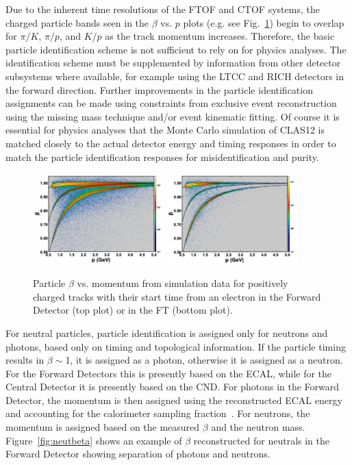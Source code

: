 Due to the inherent time resolutions of the FTOF and CTOF systems, the charged particle bands seen in the
$\beta$ vs. $p$ plots (e.g. see Fig.~\ref{fig:betavsp}) begin to overlap for $\pi/K$, $\pi/p$, and $K/p$ as
the track momentum increases. Therefore, the basic particle identification scheme is not sufficient to rely on
for physics analyses. The identification scheme must be supplemented by information from other detector
subsystems where available, for example using the LTCC and RICH detectors in the forward direction. Further
improvements in the particle identification assignments can be made using constraints from exclusive event
reconstruction using the missing mass technique and/or event kinematic fitting. Of course it is essential for
physics analyses that the Monte Carlo simulation of CLAS12 is matched closely to the actual detector energy and
timing responses in order to match the particle identification responses for misidentification and purity.

\begin{figure}[t]
\centering
\includegraphics[width=0.45\textwidth]{pics/ftof_betap.png}
\includegraphics[width=0.45\textwidth]{pics/ft_betap.png}
\caption{Particle $\beta$ vs. momentum from simulation data for positively charged tracks with their start time
  from an electron in the Forward Detector (top plot) or in the FT (bottom plot).}
\label{fig:betavsp}
\end{figure}

For neutral particles, particle identification is assigned only for neutrons and photons, based only on timing and
topological information. If the particle timing results in $\beta\sim$1, it is assigned as a photon, otherwise it
is assigned as a neutron. For the Forward Detectors this is presently based on the ECAL, while for the Central
Detector it is presently based on the CND. For photons in the Forward Detector, the momentum is then assigned
using the reconstructed ECAL energy and accounting for the calorimeter sampling fraction~\cite{ecal-nim}. For
neutrons, the momentum is assigned based on the measured $\beta$ and the neutron mass.
Figure~\ref{fig:neutbeta} shows an example of $\beta$ reconstructed for neutrals in the Forward Detector
showing separation of photons and neutrons.

